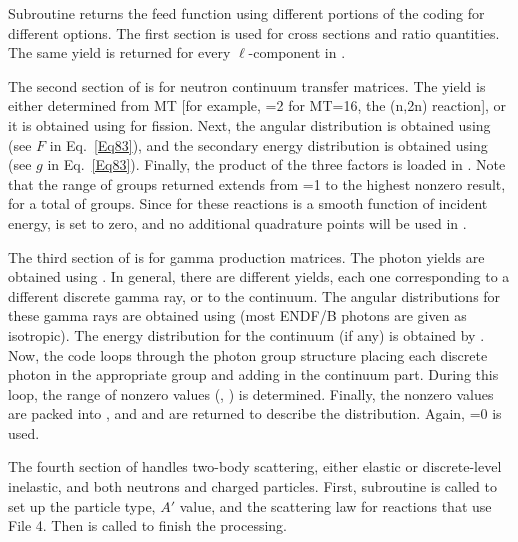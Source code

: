 Subroutine  returns the
feed function  using different portions of the coding
for different options.  The first section is used for cross sections
and ratio quantities.  The same yield 
is returned for every $\ell$-component in .

The second section of  is for neutron continuum transfer
matrices.  The yield is either determined from MT [for example,
=2 for MT=16, the (n,2n) reaction], or it is obtained using
 for fission.  Next, the
angular distribution is obtained using
 (see $F$ in Eq.~\ref{Eq83}),
and the secondary energy distribution is obtained using
 (see $g$ in
Eq.~\ref{Eq83}).  Finally, the product of the three factors is loaded
in .  Note that the range of groups returned extends from
=1 to the highest nonzero result, for a total of 
groups.  Since  for these reactions is a smooth function of
incident energy,  is set to zero, and no additional quadrature
points will be used in .

The third section of  is for gamma production matrices.  The
photon yields are obtained using .
In general, there are  different yields, each one corresponding
to a different discrete gamma ray, or to the continuum.  The angular
distributions for these gamma rays are obtained using
 (most ENDF/B photons
are given as isotropic).  The energy distribution for the continuum
(if any) is obtained by .
Now, the code loops through the photon group structure placing each
discrete photon in the appropriate group and adding in the continuum
part.  During this loop, the range of nonzero values (,
) is determined.  Finally, the nonzero values are packed
into , and  and  are returned to
describe the distribution.  Again, =0 is used.

The fourth section of  handles two-body scattering, either
elastic or discrete-level inelastic, and both neutrons and charged
particles.  First, subroutine 
is called to set up the particle type, $A'$ value, and the scattering
law for reactions that use File 4.  Then
 is called
to finish the processing.

